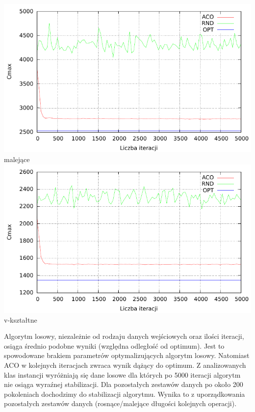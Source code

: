 \documentclass[10pt,a4paper]{article}
\begin{document}
\begin{center}
\includegraphics{./figures/inst03_dsc_smooth.pdf}
\vspace{2 mm}
\\malejące
\\
\vspace{5mm}
\includegraphics{./figures/inst04_vsh_smooth.pdf}
\vspace{2 mm}
\\v-kształtne

\end{center}
\vspace{8 mm}
Algorytm losowy, niezależnie od rodzaju danych wejściowych oraz ilości iteracji, osiąga średnio podobne wyniki (względna odległość od optimum). Jest to spowodowane brakiem parametrów optymalizujących algorytm losowy. 
Natomiast ACO w kolejnych iteracjach zwraca wynik dążący do optimum. Z analizowanych klas instancji wyróżniają się dane losowe dla których po 5000 iteracji algorytm nie osiąga wyraźnej stabilizacji. Dla pozostałych zestawów danych po około 200 pokoleniach dochodzimy do stabilizacji algorytmu. Wynika to z uporządkowania pozostałych zestawów danych (rosnące/malejące długości kolejnych operacji).
\end{document}
